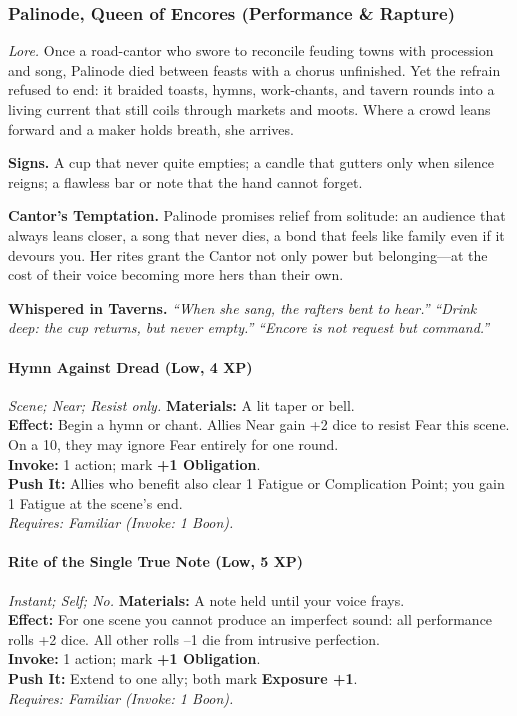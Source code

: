 
\subsubsection{Palinode, Queen of Encores (Performance \& Rapture)}
\textit{Lore.} Once a road-cantor who swore to reconcile feuding towns with procession and song, Palinode died between feasts with a chorus unfinished. Yet the refrain refused to end: it braided toasts, hymns, work-chants, and tavern rounds into a living current that still coils through markets and moots. Where a crowd leans forward and a maker holds breath, she arrives.

\textbf{Signs.} A cup that never quite empties; a candle that gutters only when silence reigns; a flawless bar or note that the hand cannot forget.

\textbf{Cantor’s Temptation.} Palinode promises relief from solitude: an audience that always leans closer, a song that never dies, a bond that feels like family even if it devours you. Her rites grant the Cantor not only power but belonging—at the cost of their voice becoming more hers than their own.

\textbf{Whispered in Taverns.}  
\emph{“When she sang, the rafters bent to hear.”}  
\emph{“Drink deep: the cup returns, but never empty.”}  
\emph{“Encore is not request but command.”}  

\paragraph*{Hymn Against Dread (Low, 4 XP)} \emph{Scene; Near; Resist only.}
\textbf{Materials:} A lit taper or bell.\\
\textbf{Effect:} Begin a hymn or chant. Allies Near gain +2 dice to resist Fear this scene. On a 10, they may ignore Fear entirely for one round.\\
\textbf{Invoke:} 1 action; mark \textbf{+1 Obligation}.\\
\textbf{Push It:} Allies who benefit also clear 1 Fatigue or Complication Point; you gain 1 Fatigue at the scene's end.\\
\emph{Requires: Familiar (\textit{Invoke:} 1 Boon).}

\paragraph*{Rite of the Single True Note (Low, 5 XP)} \emph{Instant; Self; No.}
\textbf{Materials:} A note held until your voice frays.\\
\textbf{Effect:} For one scene you cannot produce an imperfect sound: all performance rolls +2 dice. All other rolls --1 die from intrusive perfection.\\
\textbf{Invoke:} 1 action; mark \textbf{+1 Obligation}.\\
\textbf{Push It:} Extend to one ally; both mark \textbf{Exposure +1}.\\
\emph{Requires: Familiar (\textit{Invoke:} 1 Boon).}


